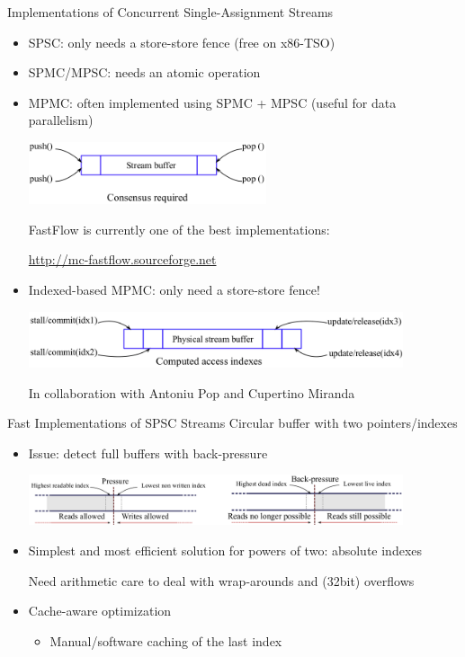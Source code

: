 \documentclass[xcolor=dvipsnames,9pt,mathserif]{beamer}
\begin{document}
\begin{frame}{Implementations of Concurrent Single-Assignment Streams}
  \begin{itemize}
  \item SPSC: only needs a store-store fence (free on x86-TSO)
  \item SPMC/MPSC: needs an atomic operation
  \item MPMC: often implemented using SPMC + MPSC (useful for data parallelism)

    \centerline{\includegraphics[width=7cm]{MPMC_consensus}}

    FastFlow is currently one of the best implementations:

    \url{http://mc-fastflow.sourceforge.net}

    \bigskip
  \item Indexed-based MPMC: only need a store-store fence!

    \centerline{\includegraphics[width=11cm]{MPMC_index-based}}

    \hfill\footnotesize In collaboration with Antoniu Pop and Cupertino Miranda
  \end{itemize}
\end{frame}

\begin{frame}{Fast Implementations of SPSC Streams}
  Circular buffer with two pointers/indexes

  \begin{itemize}
  \item Issue: detect full buffers with back-pressure

    \centerline{\includegraphics[width=11cm]{backpressure}}

  \item Simplest and most efficient solution for powers of two: absolute indexes
   
    Need arithmetic care to deal with wrap-arounds and (32bit) overflows
  \item Cache-aware optimization
    \begin{itemize}
    \item Manual/software caching of the last index
    \end{itemize}
  \end{itemize}
\end{frame}
\end{document}
